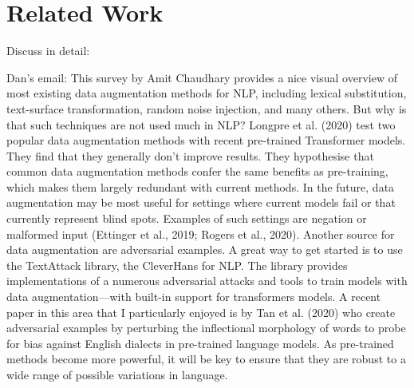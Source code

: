 \section{Related Work}
\label{sec:relate}

\begin{comment}
* Applications of perturbations
** As augmentation
- ICLR paper
- contrast set
- other two papers

** As explanation
- Perturbation

* Text generation
- Controlled style transfer
- Special tokens, finetuning gpt-2
- blank

\end{comment}

Discuss in detail:

\cite{li2020linguistically}

Dan's email:
This survey by Amit Chaudhary provides a nice visual overview of most existing data augmentation methods for NLP, including lexical substitution, text-surface transformation, random noise injection, and many others. But why is that such techniques are not used much in NLP? Longpre et al. (2020) test two popular data augmentation methods with recent pre-trained Transformer models. They find that they generally don’t improve results. They hypothesise that common data augmentation methods confer the same benefits as pre-training, which makes them largely redundant with current methods. In the future, data augmentation may be most useful for settings where current models fail or that currently represent blind spots. Examples of such settings are negation or malformed input (Ettinger et al., 2019; Rogers et al., 2020).
Another source for data augmentation are adversarial examples. A great way to get started is to use the TextAttack library, the CleverHans for NLP. The library provides implementations of a numerous adversarial attacks and tools to train models with data augmentation—with built-in support for transformers models. A recent paper in this area that I particularly enjoyed is by Tan et al. (2020) who create adversarial examples by perturbing the inflectional morphology of words to probe for bias against English dialects in pre-trained language models. As pre-trained methods become more powerful, it will be key to ensure that they are robust to a wide range of possible variations in language.

